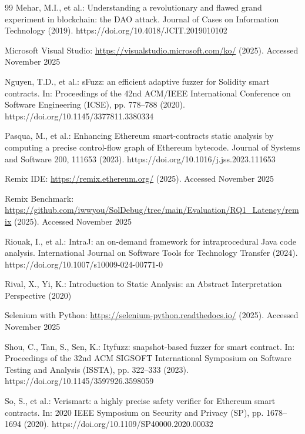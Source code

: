 \documentclass[pdflatex,sn-basic]{sn-jnl}%
\theoremstyle{thmstyleone}%
\theoremstyle{thmstyletwo}%
\theoremstyle{thmstylethree}%
\begin{document}
\begin{thebibliography}{99}
Mehar, M.I., et al.: Understanding a revolutionary and flawed grand experiment in blockchain: the
DAO attack. Journal of Cases on Information Technology (2019). https://doi.org/10.4018/JCIT.2019010102

Microsoft Visual Studio: \url{https://visualstudio.microsoft.com/ko/} (2025). Accessed November
2025

Nguyen, T.D., et al.: sFuzz: an efficient adaptive fuzzer for Solidity smart contracts. In:
Proceedings of the 42nd ACM/IEEE International Conference on Software Engineering (ICSE), pp.
778--788 (2020). https://doi.org/10.1145/3377811.3380334

Pasqua, M., et al.: Enhancing Ethereum smart-contracts static analysis by computing a precise
control-flow graph of Ethereum bytecode. Journal of Systems and Software 200, 111653 (2023). https://doi.org/10.1016/j.jss.2023.111653

Remix IDE: \url{https://remix.ethereum.org/} (2025). Accessed November 2025

Remix Benchmark: \url{https://github.com/iwwyou/SolDebug/tree/main/Evaluation/RQ1_Latency/remix} (2025). Accessed November 2025

Riouak, I., et al.: IntraJ: an on-demand framework for intraprocedural Java code analysis.
International Journal on Software Tools for Technology Transfer (2024). https://doi.org/10.1007/s10009-024-00771-0

Rival, X., Yi, K.: Introduction to Static Analysis: an Abstract Interpretation Perspective (2020)


Selenium with Python: \url{https://selenium-python.readthedocs.io/} (2025). Accessed November 2025

Shou, C., Tan, S., Sen, K.: Ityfuzz: snapshot-based fuzzer for smart contract. In: Proceedings of
the 32nd ACM SIGSOFT International Symposium on Software Testing and Analysis (ISSTA), pp. 322--333
(2023). https://doi.org/10.1145/3597926.3598059

So, S., et al.: Verismart: a highly precise safety verifier for Ethereum smart contracts. In: 2020
IEEE Symposium on Security and Privacy (SP), pp. 1678--1694 (2020). https://doi.org/10.1109/SP40000.2020.00032


\end{thebibliography}
\end{document}
